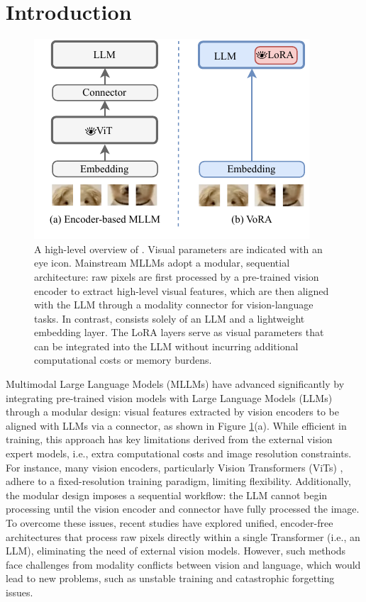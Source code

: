 \section{Introduction}
\label{sec:intro}

\begin{figure}[ht]
    \centering
    \includegraphics[width=\linewidth]{images/Figure1.pdf}
    \caption{A high-level overview of \model{}. Visual parameters are indicated with an eye icon. Mainstream MLLMs adopt a modular, sequential architecture: raw pixels are first processed by a pre-trained vision encoder to extract high-level visual features, which are then aligned with the LLM through a modality connector for vision-language tasks. In contrast, \model{} consists solely of an LLM and a lightweight embedding layer. The LoRA layers serve as visual parameters that can be integrated into the LLM without incurring additional computational costs or memory burdens. }
    \label{fig:figure1}
\end{figure}

Multimodal Large Language Models (MLLMs) \cite{blip2, llava, llava1_5, flamingo, minigpt} have advanced significantly by integrating pre-trained vision models with Large Language Models (LLMs) \cite{intern1.5, llama, vicuna, gpt3, qwen} through a modular design: visual features extracted by vision encoders to be aligned with LLMs via a connector, as shown in Figure \ref{fig:figure1}(a). While efficient in training, this approach has key limitations derived from the external vision expert models, i.e., extra computational costs and image resolution constraints. For instance, many vision encoders, particularly Vision Transformers (ViTs) \cite{siglip, clip, vit}, adhere to a fixed-resolution training paradigm, limiting flexibility. Additionally, the modular design imposes a sequential workflow: the LLM cannot begin processing until the vision encoder and connector have fully processed the image. To overcome these issues, recent studies \cite{fuyu, eve} have explored unified, encoder-free architectures that process raw pixels directly within a single Transformer (i.e., an LLM), eliminating the need of external vision models. However, such methods face challenges from modality conflicts between vision and language, which would lead to new problems, such as unstable training and catastrophic forgetting issues.

